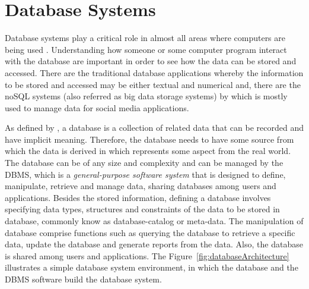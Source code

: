 \section{Database Systems}\label{database}

Database systems play a critical role in almost all areas where computers are being used \cite{ELMASRI:2015}. Understanding how someone or some computer program interact with the database are important in order to see how the data can be stored and accessed. There are the traditional database applications whereby the information to be stored and accessed may be either textual and numerical and, there are the noSQL systems (also referred as big data storage systems) by which is mostly used to manage data for social media applications.

As defined by \cite{ELMASRI:2015}, a database is a collection of related data that can be recorded and have implicit meaning. Therefore, the database needs to have some source from which the data is derived in which represents some aspect from the real world. The database can be of any size and complexity and can be managed by the \gls{DBMS}, which is a \textit{general-purpose software system} that is designed to define, manipulate, retrieve and manage data, sharing databases among users and applications. Besides the stored information, defining a database involves specifying data types, structures and constraints of the data to be stored in database, commonly know as database-catalog or meta-data. The manipulation of database comprise functions such as querying the database to retrieve a specific data, update the database and generate reports from the data. Also, the database is shared among users and applications. The Figure~\ref{fig:databaseArchitecture} illustrates a simple database system environment, in which the database and the \gls{DBMS} software build the database system. 


